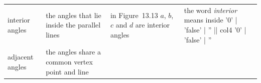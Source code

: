 \begin{table}[H]
\begin{center}
\begin{xtabular*}{\mytablewidth}[t]{|p{3cm}|p{3cm}|p{3cm}|p{20\mystarwidth}|}
    
        interior angles &
    
    
        the angles that lie inside the parallel lines &
    
    
        in Figure~13.13 \begin{math}a\end{math}, \begin{math}b\end{math},
\begin{math}c\end{math} and \begin{math}d\end{math} are interior angles &
    
    
        the word \textsl{interior} means inside%
'0' | 'false' | '' || col4 '0' | 'false' | ''
     \tabularnewline{}
    
    
        adjacent angles &
    
    
        the angles share a common vertex point and line &
    
    

\end{xtabular*}
\end{center}
\end{table}
